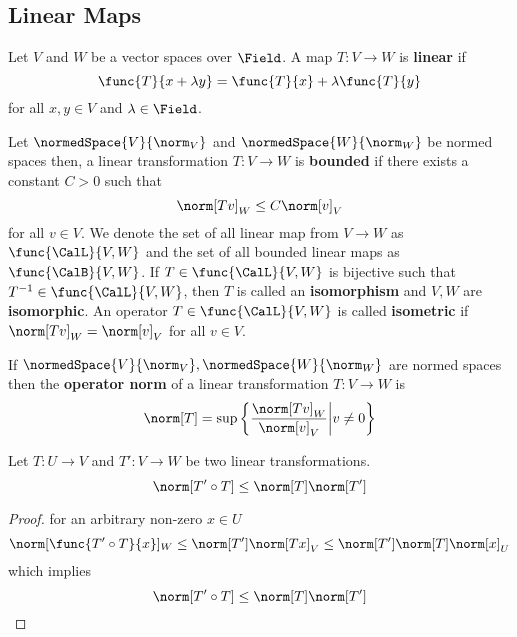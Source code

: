 \subsection{Linear Maps}
Let \(V\) and \(W\) be a vector spaces over \(\Field\). A map \(T: V \to W\) is \textbf{linear} if
\begin{equation*}
    \func{T}{x + \lambda y} = \func{T}{x} + \lambda \func{T}{y}
\end{equation*}
for all \(x,y \in V\) and \(\lambda \in \Field\).

\begin{definition}
    Let \(\normedSpace{V}{\norm_V}\) and \(\normedSpace{W}{\norm_W}\) be normed spaces then, a linear transformation \(T : V \to W\) is \textbf{bounded} if there exists a constant \(C > 0\) such that
    \begin{equation*}
        \norm[Tv]_W \leq C \norm[v]_V
    \end{equation*}
    for all \(v \in V\). We denote the set of all linear map from \(V \to W\) as \(\func{\CalL}{V,W}\) and the set of all bounded linear maps as \(\func{\CalB}{V,W}\). If \(T \in \func{\CalL}{V,W}\) is bijective such that \(T^{-1} \in \func{\CalL}{V,W}\), then \(T\) is called an \textbf{isomorphism} and \(V,W\) are \textbf{isomorphic}. An operator \(T \in \func{\CalL}{V,W}\) is called \textbf{isometric} if \(\norm[Tv]_W = \norm[v]_V\) for all \(v \in V\).
\end{definition}

\begin{definition}
    If \(\normedSpace{V}{\norm_V},\normedSpace{W}{\norm_W}\) are normed spaces then the \textbf{operator norm} of a linear transformation \(T : V \to W\) is
    \begin{equation*}
        \norm[T] = \sup \left\{\dfrac{\norm[Tv]_W}{\norm[v]_V} \middle| v \neq 0 \right\}
    \end{equation*}
\end{definition}

\begin{proposition}
    Let \(T : U \to V\) and \(T' : V \to W\) be two linear transformations.
    \begin{equation*}
        \norm[T' \circ T] \leq \norm[T] \norm[T']
    \end{equation*}
\end{proposition}

\begin{proof}
    for an arbitrary non-zero \(x \in U\)
    \begin{equation*}
        \norm[\func{T' \circ T}{x}]_W \leq \norm[T'] \norm[Tx]_V \leq \norm[T'] \norm[T] \norm[x]_U
    \end{equation*}
    which implies
    \begin{equation*}
        \norm[T' \circ T] \leq \norm[T] \norm[T']
    \end{equation*}
\end{proof}

